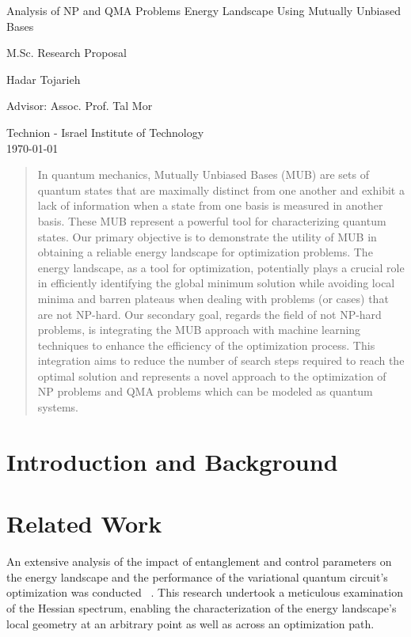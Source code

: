 \documentclass[12pt, a4paper]{article}
\begin{document}
    \onehalfspacing

    {\centering
    {\LARGE Analysis of NP and QMA Problems Energy Landscape Using Mutually Unbiased Bases \par}
    {\Medium M.Sc. Research Proposal }

    {\Small Hadar Tojarieh \par }
    {\Small Advisor: Assoc. Prof. Tal Mor \par }
    {\Small Technion - Israel Institute of Technology\\}
    \today
    \par
    }

    \singlespacing

    \begin{abstract}
        In quantum mechanics, Mutually Unbiased Bases (MUB) are sets of quantum states that are maximally distinct
        from one another and exhibit a lack of information when a state from one basis is measured in another basis.
        These MUB represent a powerful tool for characterizing quantum states.
        Our primary objective is to demonstrate the utility of MUB in obtaining a reliable energy landscape
        for optimization problems.
        The energy landscape, as a tool for optimization, potentially plays a crucial role in efficiently identifying
        the global minimum solution while avoiding local minima and barren plateaus when dealing with problems (or cases) that are not NP-hard.
        Our secondary goal, regards the field of not NP-hard problems,
        is integrating the MUB approach with machine learning techniques to enhance the efficiency of the
        optimization process.
        This integration aims to reduce the number of search steps required to reach the optimal
        solution and represents a novel approach to the optimization of NP problems and QMA problems which can be modeled as
        quantum systems.
    \end{abstract}

    \tableofcontents

    \onehalfspacing


    \section{Introduction and Background}\label{sec:introduction-and-background}
    

    \section{Related Work}\label{sec:related-work}
    An extensive analysis of the impact of entanglement and control parameters on the energy landscape
    and the performance of the variational quantum circuit's optimization was conducted ~\cite{kim2022quantum}.
    This research undertook a meticulous examination of the Hessian spectrum, 
    enabling the characterization of the energy landscape's local geometry at an arbitrary point as well
    as across an optimization path.
\end{document}
